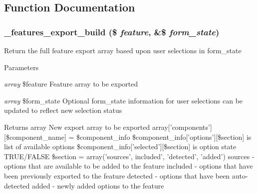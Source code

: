 \subsection{Function Documentation}
\hypertarget{features_8admin_8inc_ae49cf45c928b2cf3a06100fce2021f4a}{
\subsubsection[{\_\-features\_\-export\_\-build}]{\setlength{\rightskip}{0pt plus 5cm}\_\-features\_\-export\_\-build (\$ {\em feature}, \/  \&\$ {\em form\_\-state})}}
\label{features_8admin_8inc_ae49cf45c928b2cf3a06100fce2021f4a}
Return the full feature export array based upon user selections in form\_\-state 
\begin{DoxyParams}{Parameters}
\item[{\em array}]\$feature Feature array to be exported \item[{\em array}]\$form\_\-state Optional form\_\-state information for user selections can be updated to reflect new selection status \end{DoxyParams}
\begin{DoxyReturn}{Returns}
array New export array to be exported array\mbox{[}'components'\mbox{]}\mbox{[}\$component\_\-name\mbox{]} = \$component\_\-info \$component\_\-info\mbox{[}'options'\mbox{]}\mbox{[}\$section\mbox{]} is list of available options \$component\_\-info\mbox{[}'selected'\mbox{]}\mbox{[}\$section\mbox{]} is option state TRUE/FALSE \$section = array('sources', included', 'detected', 'added') sources -\/ options that are available to be added to the feature included -\/ options that have been previously exported to the feature detected -\/ options that have been auto-\/detected added -\/ newly added options to the feature
\end{DoxyReturn}

